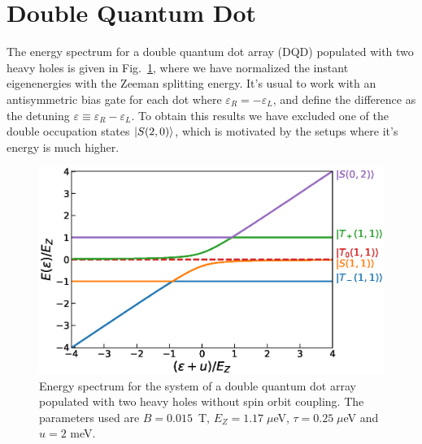 \documentclass[a4paper,11pt]{article}
\begin{document}
\section{\label{sec:DQD}Double Quantum Dot}
The energy spectrum for a double quantum dot array (DQD) populated with two heavy holes is given in Fig.~\ref{fig:eigenenergies_2QD_2HH_wo_SOC}, where we have normalized the instant eigenenergies with the Zeeman splitting energy. It's usual to work with an antisymmetric bias gate for each dot where $\varepsilon_R=-\varepsilon_L$, and define the difference as the detuning $\varepsilon\equiv \varepsilon_R-\varepsilon_L$. To obtain this results we have excluded one of the double occupation states $\ket{S(2,0)}$, which is motivated by the setups where it's energy is much higher.
\begin{figure}[!htbp]
	\centering
	\includegraphics[width=0.8\linewidth]{eigenenergies_2QD_2HH_wo_SOC.eps}
	\caption{Energy spectrum for the system of a double quantum dot array populated with two heavy holes without spin orbit coupling. The parameters used are $B=0.015$~T, $E_Z=1.17\; \mu$eV, $\tau=0.25\; \mu$eV and $u=2$ meV.}
	\label{fig:eigenenergies_2QD_2HH_wo_SOC}
\end{figure}
\end{document}
